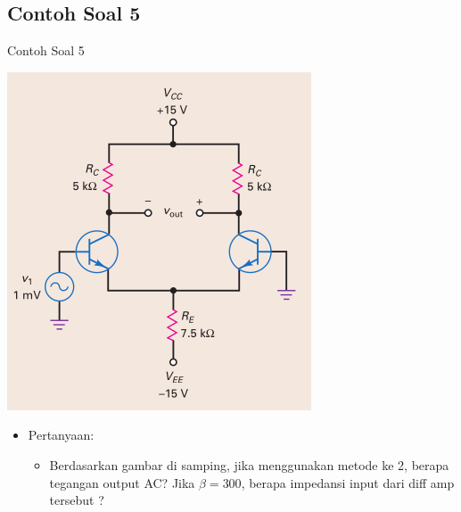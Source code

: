 \documentclass[aspectratio=169]{beamer}
\begin{document}
\subsection{Contoh Soal 5}
\begin{frame}{Contoh Soal 5}
	\begin{multicols}{2}
		\begin{center}
			\includegraphics[height=0.7\textheight]{gambar/01.diff-amp/01.contoh_soal_1-2}
		\end{center}
		\columnbreak
		\begin{itemize}
			\item Pertanyaan:
			\begin{itemize}
				\item Berdasarkan gambar di samping, jika menggunakan metode ke 2, berapa tegangan output AC? Jika $ \beta = 300 $, berapa impedansi input dari diff amp tersebut ?
			\end{itemize}
		\end{itemize}
	\end{multicols}
\end{frame}
\end{document}
